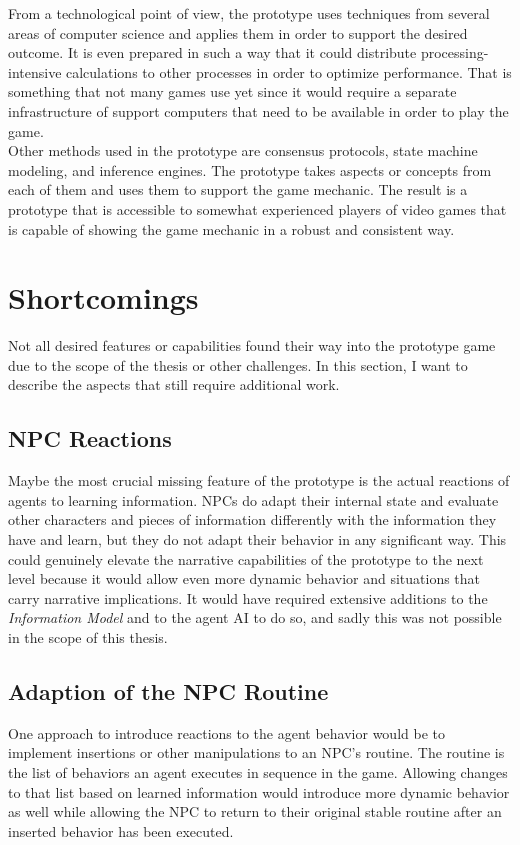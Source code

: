 From a technological point of view, the prototype uses techniques from several areas of computer science and applies them in order to support the desired outcome. It is even prepared in such a way that it could distribute processing-intensive calculations to other processes in order to optimize performance. That is something that not many games use yet since it would require a separate infrastructure of support computers that need to be available in order to play the game.\\
Other methods used in the prototype are consensus protocols, state machine modeling, and inference engines. The prototype takes aspects or concepts from each of them and uses them to support the game mechanic. The result is a prototype that is accessible to somewhat experienced players of video games that is capable of showing the game mechanic in a robust and consistent way.
\section{Shortcomings}
Not all desired features or capabilities found their way into the prototype game due to the scope of the thesis or other challenges. In this section, I want to describe the aspects that still require additional work.
\subsection{NPC Reactions}
Maybe the most crucial missing feature of the prototype is the actual reactions of agents to learning information. NPCs do adapt their internal state and evaluate other characters and pieces of information differently with the information they have and learn, but they do not adapt their behavior in any significant way. This could genuinely elevate the narrative capabilities of the prototype to the next level because it would allow even more dynamic behavior and situations that carry narrative implications. It would have required extensive additions to the \textit{Information Model} and to the agent AI to do so, and sadly this was not possible in the scope of this thesis.
\subsection{Adaption of the NPC Routine}
One approach to introduce reactions to the agent behavior would be to implement insertions or other manipulations to an NPC’s routine. The routine is the list of behaviors an agent executes in sequence in the game. Allowing changes to that list based on learned information would introduce more dynamic behavior as well while allowing the NPC to return to their original stable routine after an inserted behavior has been executed.
